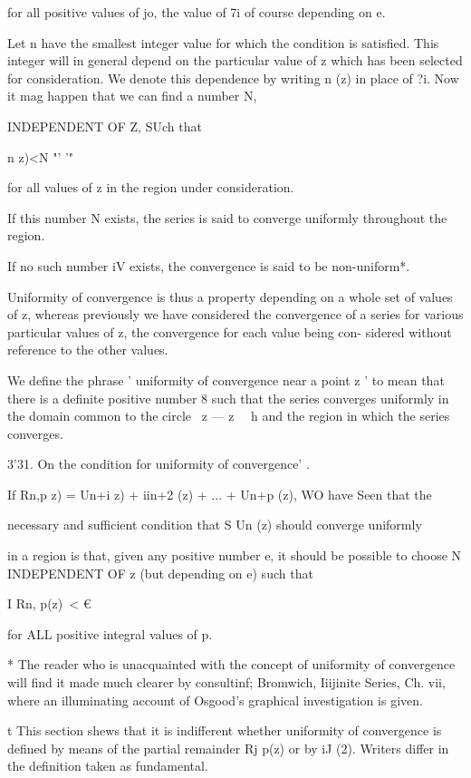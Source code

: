 for all positive values of jo, the value of 7i of course depending on
e.

Let n have the smallest integer value for which the condition is
satisfied. This integer will in general depend on the particular value
of z which has been selected for consideration. We denote this
dependence by writing n (z) in place of ?i. Now it mag happen that we
can find a number N,

INDEPENDENT OF Z, SUch that

n z)<N "' '"

for all values of z in the region under consideration.

If this number N exists, the series is said to converge uniformly
throughout the region.

If no such number iV exists, the convergence is said to be
non-uniform*.

Uniformity of convergence is thus a property depending on a whole set
of values of z, whereas previously we have considered the convergence
of a series for various particular values of z, the convergence for
each value being con- sidered without reference to the other values.

We define the phrase ' uniformity of convergence near a point z ' to
mean that there is a definite positive number 8 such that the series
converges uniformly in the domain common to the circle \ z — z \ \ h
and the region in which the series converges.

3'31. On the condition for uniformity of convergence' .

If Rn,p z) = Un+i z) + iin+2 (z) + ... + Un+p (z), WO have Seen that
the

necessary and sufficient condition that S Un (z) should converge
uniformly

in a region is that, given any positive number e, it should be
possible to choose N INDEPENDENT OF z (but depending on e) such that

I Rn, p(z)\ < €

for ALL positive integral values of p.

* The reader who is unacquainted with the concept of uniformity of
convergence will find it made much clearer by consultinf; Bromwich,
Iiijinite Series, Ch. vii, where an illuminating account of Osgood's
graphical investigation is given.

t This section shews that it is indifferent whether uniformity of
convergence is defined by means of the partial remainder Rj p(z) or by
iJ (2). Writers differ in the definition taken as fundamental.



